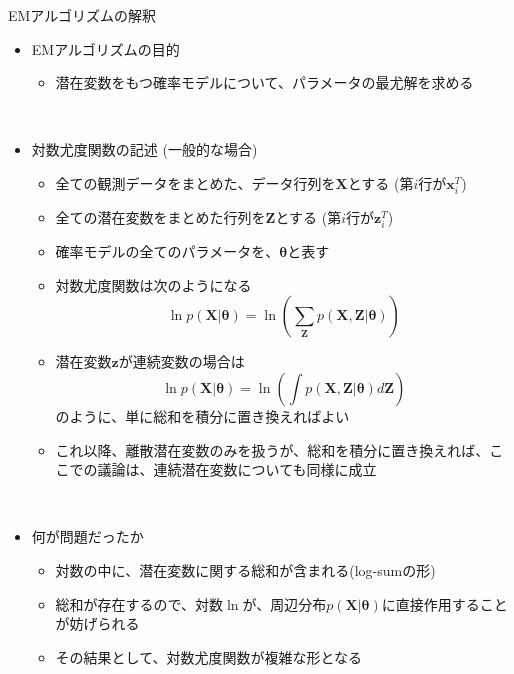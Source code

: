 \documentclass[dvipdfmx,notheorems,t]{beamer}
\begin{document}
\begin{frame}{EMアルゴリズムの解釈}

\begin{itemize}
	\item EMアルゴリズムの目的
	\begin{itemize}
		\item 潜在変数をもつ確率モデルについて、パラメータの最尤解を求める
	\end{itemize} \
	
	\item 対数尤度関数の記述 (一般的な場合)
	\begin{itemize}
		\item 全ての観測データをまとめた、データ行列を$\bm{X}$とする (第$i$行が$\bm{x}_i^T$)
		\item 全ての潜在変数をまとめた行列を$\bm{Z}$とする (第$i$行が$\bm{z}_i^T$)
		\item 確率モデルの全てのパラメータを、$\bm{\theta}$と表す
		\newline
		\item 対数尤度関数は次のようになる
		\begin{equation}
			\ln p(\bm{X} | \bm{\theta}) = \ln \left( \sum_{\bm{Z}} p(\bm{X}, \bm{Z} | \bm{\theta}) \right)
		\end{equation}
		
		\item 潜在変数$\bm{z}$が連続変数の場合は
		\begin{equation}
			\ln p(\bm{X} | \bm{\theta}) = \ln \left( \int p(\bm{X}, \bm{Z} | \bm{\theta}) d\bm{Z} \right)
		\end{equation}
		のように、単に総和を積分に置き換えればよい
		\newline
		\item これ以降、離散潜在変数のみを扱うが、総和を積分に置き換えれば、ここでの議論は、連続潜在変数についても同様に成立
	\end{itemize} \
	
	\item 何が問題だったか
	\begin{itemize}
		\item \alert{対数の中に、潜在変数に関する総和が含まれる}(\alert{log-sum}の形)
		\item 総和が存在するので、対数$\ln$が、周辺分布$p(\bm{X} | \bm{\theta})$に直接作用することが妨げられる
		\item その結果として、対数尤度関数が複雑な形となる
	\end{itemize} \
	

\end{itemize}
\end{frame}
\end{document}
